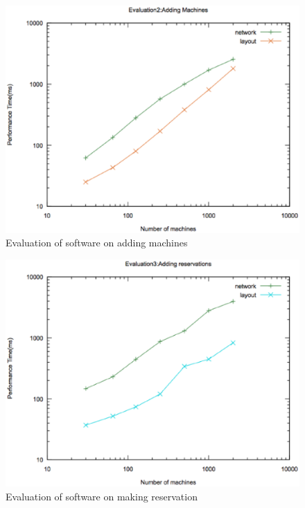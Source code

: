 \begin{figure}[h]
 \includegraphics[width=\linewidth]{addmachine.eps}
  \caption{Evaluation of software on adding machines}
  \label{addmachine}
\end{figure}

\begin{figure}[h]
 \includegraphics[width=\linewidth]{addreservation.eps}
  \caption{Evaluation of software on making reservation}
\end{figure}